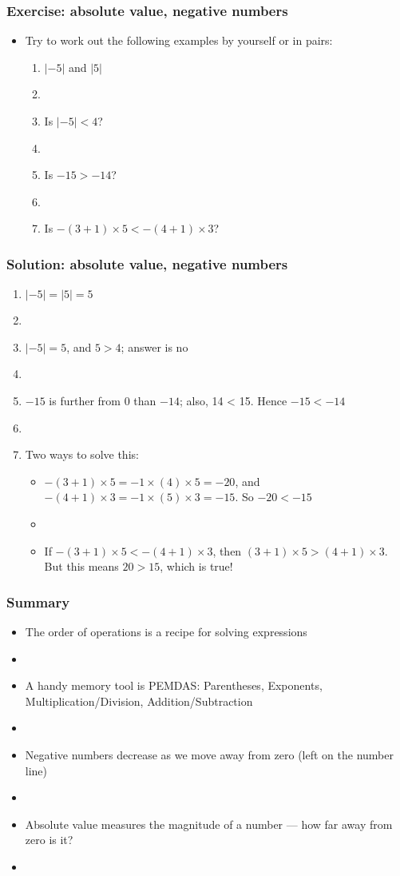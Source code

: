 \documentclass[12pt]{beamer}
\newcommand{\myframe}[1]{\begin{frame} \frametitle{#1}}
\begin{document}
\myframe{Exercise: absolute value, negative numbers}
\begin{itemize}
\item Try to work out the following examples by yourself or in pairs:
\begin{enumerate}
\item $|-5|$ and $|5|$
\item[]
\item Is $|-5| < 4$?
\item[]
\item Is $-15 > -14$? 
\item[]
\item Is $-(3 + 1)\times 5 < -(4 + 1)\times 3$?
\end{enumerate}
\end{itemize}
\end{frame}

\myframe{Solution: absolute value, negative numbers}
\begin{enumerate}
\item $|-5| = |5| = 5$
\item[]
\item $|-5| = 5$, and $5 > 4$; answer is no
\item[]
\item $-15$ is further from 0 than $-14$; also, 14 < 15. Hence $-15 < -14$
\item[]
\item Two ways to solve this:
\begin{itemize}
\item $-(3+1)\times 5 = -1\times(4)\times 5 = -20$, and $-(4+1)\times 3 = -1\times (5) \times 3 = -15$. So $-20 < -15$
\item[]
\item If $-(3+1)\times 5 < -(4+1)\times 3$, then $(3+1)\times 5 > (4+1)\times 3$. But this means $20 > 15$, which is true!
\end{itemize}
\end{enumerate}
\end{frame}

\myframe{Summary}
\begin{itemize}
\item The order of operations is a recipe for solving expressions
\item[]
\item A handy memory tool is PEMDAS: Parentheses, Exponents, Multiplication/Division, Addition/Subtraction
\item[]
\item Negative numbers decrease as we move away from zero (left on the number line)
\item[]
\item Absolute value measures the magnitude of a number --- how far away from zero is it?
\item[]
\end{itemize}
\end{frame}
\end{document}
